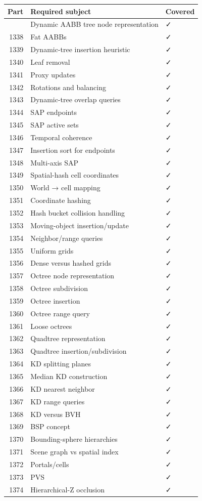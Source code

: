 {\def\LTcaptype{none} %
\begin{longtable}[]{@{}rll@{}}
\toprule\noalign{}
Part & Required subject & Covered \\
\midrule\noalign{}
\endhead
\bottomrule\noalign{}
\endlastfoot
1337 & Dynamic AABB tree node representation & ✓ \\
1338 & Fat AABBs & ✓ \\
1339 & Dynamic-tree insertion heuristic & ✓ \\
1340 & Leaf removal & ✓ \\
1341 & Proxy updates & ✓ \\
1342 & Rotations and balancing & ✓ \\
1343 & Dynamic-tree overlap queries & ✓ \\
1344 & SAP endpoints & ✓ \\
1345 & SAP active sets & ✓ \\
1346 & Temporal coherence & ✓ \\
1347 & Insertion sort for endpoints & ✓ \\
1348 & Multi-axis SAP & ✓ \\
1349 & Spatial-hash cell coordinates & ✓ \\
1350 & World → cell mapping & ✓ \\
1351 & Coordinate hashing & ✓ \\
1352 & Hash bucket collision handling & ✓ \\
1353 & Moving-object insertion/update & ✓ \\
1354 & Neighbor/range queries & ✓ \\
1355 & Uniform grids & ✓ \\
1356 & Dense versus hashed grids & ✓ \\
1357 & Octree node representation & ✓ \\
1358 & Octree subdivision & ✓ \\
1359 & Octree insertion & ✓ \\
1360 & Octree range query & ✓ \\
1361 & Loose octrees & ✓ \\
1362 & Quadtree representation & ✓ \\
1363 & Quadtree insertion/subdivision & ✓ \\
1364 & KD splitting planes & ✓ \\
1365 & Median KD construction & ✓ \\
1366 & KD nearest neighbor & ✓ \\
1367 & KD range queries & ✓ \\
1368 & KD versus BVH & ✓ \\
1369 & BSP concept & ✓ \\
1370 & Bounding-sphere hierarchies & ✓ \\
1371 & Scene graph vs spatial index & ✓ \\
1372 & Portals/cells & ✓ \\
1373 & PVS & ✓ \\
1374 & Hierarchical-Z occlusion & ✓ \\
\end{longtable}
}

